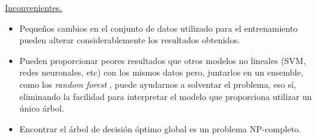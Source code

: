 \underline{Inconvenientes.}\\
\begin{itemize}
	\item Pequeños cambios en el conjunto de datos utilizado para el entrenamiento pueden alterar considerablemente los resultados obtenidos.
	\item Pueden proporcionar peores resultados que otros modelos no lineales (SVM, redes neuronales, etc) con los mismos datos pero, juntarlos en un ensemble, como los \textit{random forest} \cite{randomforest}, puede ayudarnos a solventar el problema, eso sí, eliminando la facilidad para interpretar el modelo que proporciona utilizar un único árbol.
	\item Encontrar el árbol de decisión óptimo global es un problema NP-completo.
\end{itemize}